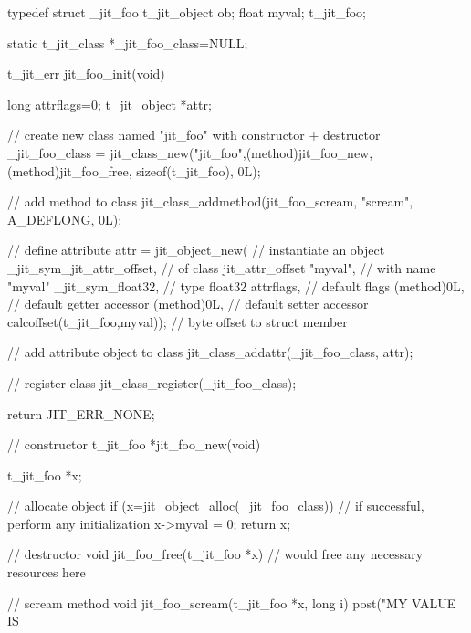 \begin{DoxyCode}
typedef struct _jit_foo
{
   t_jit_object    ob;
   float          myval;
} t_jit_foo;

static t_jit_class *_jit_foo_class=NULL;

t_jit_err jit_foo_init(void) 
{
   long attrflags=0;
   t_jit_object *attr;
   
   // create new class named "jit_foo" with constructor + destructor
   _jit_foo_class = jit_class_new("jit_foo",(method)jit_foo_new,   
      (method)jit_foo_free, sizeof(t_jit_foo), 0L);

   // add method to class
   jit_class_addmethod(jit_foo_scream, "scream", A_DEFLONG, 0L);

   // define attribute   
   attr = jit_object_new(      // instantiate an object
      _jit_sym_jit_attr_offset,   // of class jit_attr_offset
      "myval",         // with name "myval"
      _jit_sym_float32,       // type float32
      attrflags,         // default flags
      (method)0L,         // default getter accessor
      (method)0L,         // default setter accessor
      calcoffset(t_jit_foo,myval)); // byte offset to struct member
   
   // add attribute object to class
   jit_class_addattr(_jit_foo_class, attr);
   
   // register class
   jit_class_register(_jit_foo_class);

   return JIT_ERR_NONE;
} 

// constructor
t_jit_foo *jit_foo_new(void)
{
   t_jit_foo *x;
   
   // allocate object
   if (x=jit_object_alloc(_jit_foo_class))
   {
      // if successful, perform any initialization
      x->myval = 0;
   }
   return x;
}

// destructor
void jit_foo_free(t_jit_foo *x)
{
   // would free any necessary resources here
}

// scream method
void jit_foo_scream(t_jit_foo *x, long i)
{   
   post("MY VALUE IS %
}
\end{DoxyCode}


